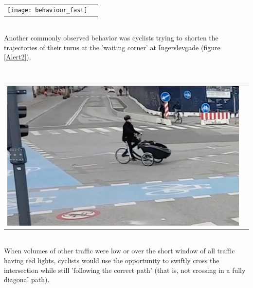 \ \\ 
\raggedbottom
\begin{tabular}{@{}cc}
\texttt{[image: behaviour\_fast]} 
\end{tabular}
\label{Alert1}
\ \\

Another commonly observed behavior was cyclists trying to shorten the trajectories of their turns 
at the 'waiting corner' at Ingerslevgade (figure \ref{Alert2}).

\raggedbottom
\ \\ 
\noindent
\begin{tabular}{@{}cc}
\includegraphics[width=1.0\columnwidth]{shorten_traj} 
\end{tabular}
\label{Alert2}
\ \\

When volumes of other traffic were low or over the short window of all traffic having red lights, cyclists would use the opportunity 
to swiftly cross the intersection while still 'following the correct path' (that is, not crossing in a fully diagonal path). 


